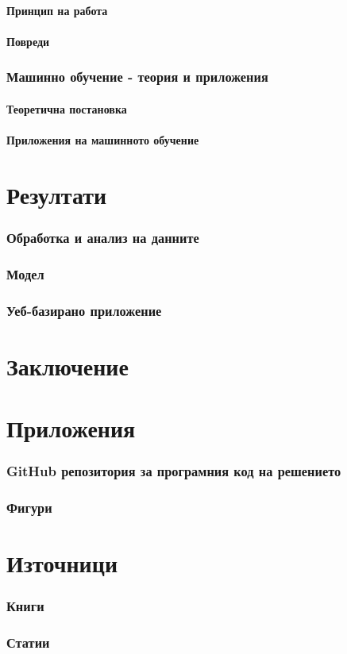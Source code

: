 \documentclass{article}
\begin{document}
\subsection{Принцип на работа}
\subsection{Повреди}
\section{Машинно обучение - теория и приложения}
\subsection{Теоретична постановка}
\subsection{Приложения на машинното обучение}
\newpage
\part{Резултати}
\setcounter{section}{0}
\section{Обработка и анализ на данните}
\section{Модел}
\section{Уеб-базирано приложение}
\newpage
\part{Заключение}
\setcounter{section}{0}
\newpage
\part{Приложения}
\setcounter{section}{0}
\section{GitHub репозитория за програмния код на решението}
\section{Фигури}
\newpage
\part{Източници}
\setcounter{section}{0}
\section{Книги}
\section{Статии}
\end{document}

